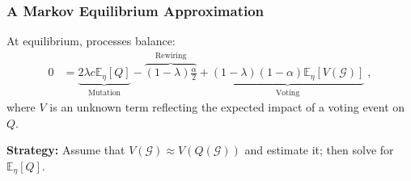 \documentclass{beamer}
\newcommand\E[0]{\mathbb{E}}
\begin{document}
		\begin{frame}\frametitle{A Markov Equilibrium Approximation}
			At equilibrium, processes balance: 
			\begin{align*}
				0 &= \underbrace{2\lambda c\E_\eta[Q]}_{\text{Mutation}}  - \overbrace{(1-\lambda)\frac{\alpha}{2}}^{\text{Rewiring}} + \underbrace{(1-\lambda)(1-\alpha)\mathbb{E}_\eta[V(\mathcal{G})]}_{\text{Voting}}\;, 
			\end{align*}
			where $V$ is an unknown term reflecting the expected impact of a voting event on $Q$. 

			\textbf{Strategy:} Assume that $V(\mathcal{G}) \approx V(Q(\mathcal{G}))$ and estimate it; then solve for $\E_\eta[Q]$.
		\end{frame}
	
		
\end{document}
